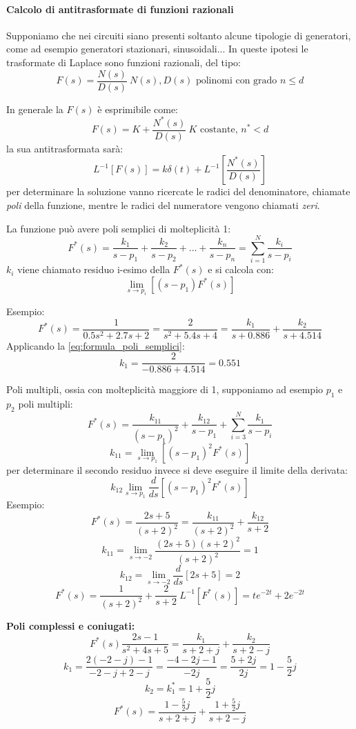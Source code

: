 
\paragraph{Calcolo di antitrasformate di funzioni razionali}
Supponiamo che nei circuiti siano presenti soltanto alcune tipologie di generatori, come ad esempio
generatori stazionari, sinusoidali... In queste ipotesi le trasformate di Laplace sono funzioni 
razionali, del tipo:
$$
F(s) = \frac{N(s)}{D(s)}\ N(s),D(s) \text{ polinomi con grado } n\leq d
$$

In generale la $F(s)$ è esprimibile come:
$$
F(s) = K + \frac{N^*(s)}{D(s)}\ K \text{ costante, } n^* < d
$$
la sua antitrasformata sarà:
$$
L^{-1}[F(s)] = k\delta(t) + L^{-1}\left[\frac{N^*(s)}{D(s)}\right] 
$$
per determinare la soluzione vanno ricercate le radici del denominatore, chiamate \textit{poli}
della funzione, mentre le radici del numeratore vengono chiamati \textit{zeri}.

La funzione può avere poli semplici di molteplicità 1:
$$
F^*(s) = \frac{k_1}{s-p_1} + \frac{k_2}{s-p_2} + ... + \frac{k_n}{s-p_n} = \sum_{i=1}^{N}\frac{k_i}{s-p_i}
$$
$k_i$ viene chiamato residuo i-esimo della $F^*(s)$ e si calcola con:
\begin{equation}
\lim_{s\to p_i} \left[(s-p_1)F^*(s)\right]
\label{eq:formula_poli_semplici}
\end{equation}

Esempio:
$$
F^*(s) = \frac{1}{0.5s^2+2.7s+2} = \frac{2}{s^2+5.4s+4} = \frac{k_1}{s+0.886} + \frac{k_2}{s+4.514}
$$
Applicando la \ref{eq:formula_poli_semplici}:
$$
k_1 = \frac{2}{-0.886+4.514} = 0.551
$$

Poli multipli, ossia con molteplicità maggiore di 1, supponiamo ad esempio $p_1$ e $p_2$ poli multipli:
$$
F^*(s) = \frac{k_{11}}{(s-p_1)^2} + \frac{k_{12}}{s-p_1} + \sum_{i=3}^{N} \frac{k_1}{s-p_i}
$$
$$
k_{11} = \lim_{s\to p_1} \left[(s-p_1)^2F^*(s)\right]
$$
per determinare il secondo residuo invece si deve eseguire il limite della derivata:
$$
k_{12} \lim_{s\to p_1} \frac{d}{ds} \left[(s-p_1)^2 F^*(s)\right]
$$
Esempio:
$$
F^*(s) = \frac{2s+5}{(s+2)^2} = \frac{k_{11}}{(s+2)^2} + \frac{k_{12}}{s+2}
$$
$$
k_{11} = \lim_{s\to-2} \frac{(2s+5)(s+2)^2}{(s+2)^2} = 1
$$
$$
k_{12} = \lim_{s \to -2} \frac{d}{ds} [2s+5] = 2
$$
$$
F^*(s) = \frac{1}{(s+2)^2}+\frac{2}{s+2}\ L^{-1}[F^*(s)] = te^{-2t}+2e^{-2t}
$$

\textbf{Poli complessi e coniugati:}
$$
F^*(s) \frac{2s-1}{s^2+4s+5} = \frac{k_1}{s+2+j} + \frac{k_2}{s+2-j}
$$
$$
k_1 = \frac{2(-2-j)-1}{-2-j+2-j} = \frac{-4-2j-1}{-2j} = \frac{5+2j}{2j} = 1 - \frac{5}{2}j
$$
$$
k_2 = k_1^* = 1+\frac{5}{2}j
$$
$$
F^*(s) = \frac{1-\frac{5}{2}j}{s+2+j} + \frac{1+\frac{5}{2}j}{s+2-j}
$$

